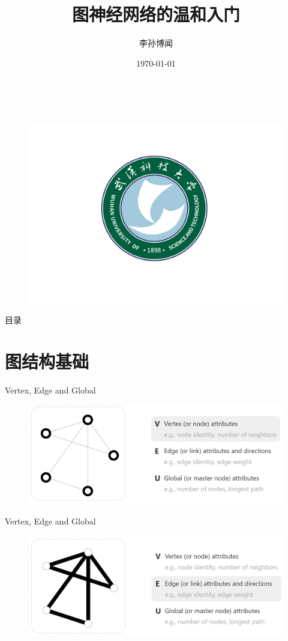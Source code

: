 \documentclass{beamer}
\author[Sunbowen Lee]{李孙博闻}
\title[Graph neural network]{图神经网络的温和入门}
\institute{武汉科技大学 \\ 理学院 \\ 冶金工业过程系统科学湖北省重点实验室}
\date{\today}
\begin{document}
\
\begin{frame}
    \titlepage
    \begin{figure}[htpb]
        \centering
        \vspace{-0.7cm}
        \includegraphics[width=0.45\linewidth]{wust.png}
    \end{figure}
\end{frame}

\begin{frame}{目录}
        \tableofcontents[sectionstyle=show,subsectionstyle=hide]
\end{frame}


\section{图结构基础}


\begin{frame}{Vertex, Edge and Global}
    \begin{figure}
        \includegraphics[width=\textwidth]{vertex.png}
    \end{figure}
\end{frame}

\begin{frame}{Vertex, Edge and Global}
    \begin{figure}
        \includegraphics[width=\textwidth]{edge.png}
    \end{figure}
\end{frame}
\end{document}
